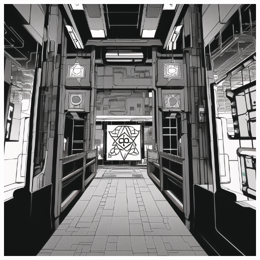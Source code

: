 \documentclass{article}
\begin{document}
	\newpage
	\includegraphics*[viewport = 100 0 628 768]{magic_cover.png}
	
	
	
	
	\newpage
	
	
	\newpage
	
	
	\newpage
	
	
	\newpage
	
	
	\newpage
	
	
	\newpage
	
	
	\newpage
	
	
	
\end{document}
